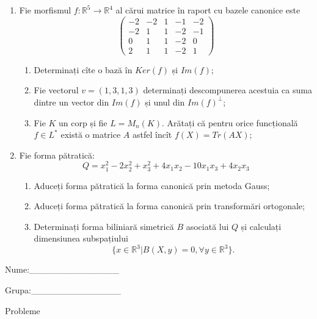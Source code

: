 \documentclass{article}
\begin{document}
\begin{enumerate}
 \item Fie morfismul $f:\mathbb{R}^5 \to \mathbb{R}^4$ al cărui matrice în raport cu bazele canonice este
$$\begin{pmatrix}
-2&-2&1&-1&-2\\
-2&1&1&-2&-1\\
0&1&1&-2&0\\
2&1&1&-2&1
\end{pmatrix}$$

\begin{enumerate}
\item Determinați cîte o bază în $Ker(f)$ și $Im(f)$;
\item Fie vectorul $v=(1,3,1,3)$ determinați descompunerea acestuia ca suma dintre un vector din $Im(f)$ și unul din $Im(f)^\perp$;
\item Fie $K$ un corp și fie $L=M_n(K)$. Arătați că pentru orice funcțională $f \in L^*$ există o matrice $A$ astfel încît $f(X)=Tr(AX)$;
\end{enumerate}
\item Fie forma pătratică:
$$Q= x_1^2-2x_2^2+x_3^2+4x_1x_2-10x_1x_3+4x_2x_3$$

\begin{enumerate}
\item Aduceți forma pătratică la forma canonică prin metoda Gauss;
\item Aduceți forma pătratică la forma canonică prin transformări ortogonale;
\item Determinați forma biliniară simetrică $B$ asociată lui $Q$ și calculați dimensiunea subspațiului
$$\{x \in \mathbb{R}^3 | B(X,y)=0,\forall y \in \mathbb{R}^3\}.$$

\end{enumerate}
\end{enumerate}
\newpage
\begin{flushright}
Nume:\_\_\_\_\_\_\_\_\_\_\_\_\_\_
 
 
Grupa:\_\_\_\_\_\_\_\_\_\_\_\_\_\_
\end{flushright}
\begin{center}
\vspace{2cm}
{\Large Probleme}
\vspace{2cm}
\end{center}
\end{document}
